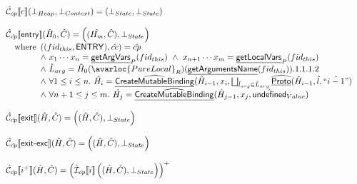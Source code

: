 \[
\begin{array}{l} 
\aN_{\acp}\lbr c \rbr (\bot_{Heap},\bot_{Context})
 = (\bot_{State},\bot_{State})\\\\

\aN _{\acp}\lbr {\sf entry} \rbr (\hat{H}_0,\hat{C}) =
 \left((\hat{H_m},\hat{C}), \bot_{State}\right)\\
 \quad\wherec{
   (({fid_{this}},\SF{ENTRY}),\hat{cc}) = \acp \\
   \land\ x_1 \cdots x_n = \chf{getArgVars}_P(fid_{this})\ 
   \land\ x_{n+1} \cdots x_m = \chf{getLocalVars}_P(fid_{this}) \\
   \land\ \hat{L}_{arg} = \hat{H}_0(\avarloc{PureLocal}_R)(\chf{getArgumentsName}(fid_{this})).1.1.1.2 \\
   \land\ \forall 1 \leq i \leq n.\ \hat{H_i}= \ahf{CreateMutableBinding}(\hat{H}_{i-1}, x_i, 
     \bigsqcup_{\hat{l}_{arg}\in\hat{L}_{arg}}\ahf{Proto}(\hat{H}_{i-1},\hat{l},\hat{``i-1"}) \\
   \land\ \forall n+1 \leq j \leq m.\ \hat{H_j}= \ahf{CreateMutableBinding}(\hat{H}_{j-1}, x_j, \aundef_{Value})
}\\
\\

\aN_{\acp}\lbr \SF{exit} \rbr (\hat{H},\hat{C}) = \left((\hat{H},\hat{C}),\bot_{State}\right) \\
\\
\aN_{\acp}\lbr \SF{exit-exc} \rbr (\hat{H},\hat{C}) = \left((\hat{H},\hat{C}),\bot_{State}\right) \\
\\

\aN_{\acp}\lbr i^+\rbr (\hat{H},\hat{C}) =
  \left(\aI _{\acp} \lbr i\rbr\left((\hat{H},\hat{C}),\bot_{State}\right)\right)^{+} \\\\



\end{array}\]

